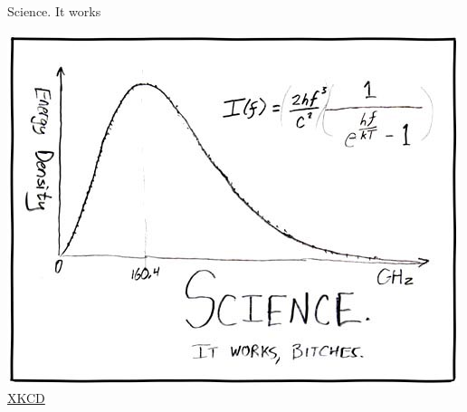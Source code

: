\documentclass{beamer}
\begin{document}
\begin{frame}{Science. It works}
\begin{center}
\includegraphics[width=0.7\linewidth]{./science}\\

\href{http://xkcd.com/54/}{XKCD}
\end{center}

\end{frame}
\end{document}
